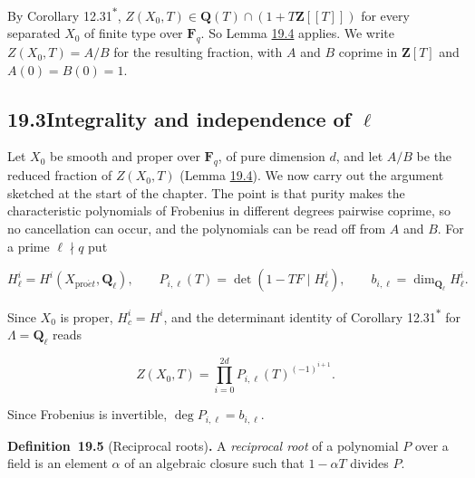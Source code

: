 \documentclass[11pt]{article}
\newenvironment{bpstatement}[2]{\par\addvspace{0.6\baselineskip}\noindent\textbf{#1}#2\textbf{.}\enspace\ignorespaces}
  {\par\addvspace{0.4\baselineskip}}
\newcommand{\bpout}[1]{#1\textsuperscript{\hyperlink{bp-outside}{\ensuremath{\ast}}}}
\begin{document}
\label{bp17}%
By Corollary \bpout{12.31}, \(Z(X_0,T)\in\mathbf Q(T)\cap(1+T\mathbf Z[[T]])\) for every separated \(X_0\) of finite type over \(\mathbf F_q\). So Lemma \hyperref[bp15]{19.4} applies. We write \(Z(X_0,T)=A/B\) for the resulting fraction, with \(A\) and \(B\) coprime in \(\mathbf Z[T]\) and \(A(0)=B(0)=1\).


\subsection*{\texorpdfstring{19.3\quad Integrality and independence of $\ell$}{19.3 Integrality and independence of ell}}
\label{bp18}%
\label{bp19}%
Let \(X_0\) be smooth and proper over \(\mathbf F_q\), of pure dimension \(d\), and let \(A/B\) be the reduced fraction of \(Z(X_0,T)\) (Lemma \hyperref[bp15]{19.4}). We now carry out the argument sketched at the start of the chapter. The point is that purity makes the characteristic polynomials of Frobenius in different degrees pairwise coprime, so no cancellation can occur, and the polynomials can be read off from \(A\) and \(B\). For a prime \(\ell\nmid q\) put

\[
H^i_\ell=H^i(X_{\mathrm{pro}\acute{e}t},\mathbf Q_\ell),\qquad
P_{i,\ell}(T)=\det(1-TF\mid H^i_\ell),\qquad
b_{i,\ell}=\dim_{\mathbf Q_\ell}H^i_\ell.
\]

Since \(X_0\) is proper, \(H^i_c=H^i\), and the determinant identity of Corollary \bpout{12.31} for \(\Lambda=\mathbf Q_\ell\) reads

\[
Z(X_0,T)=\prod_{i=0}^{2d}P_{i,\ell}(T)^{(-1)^{i+1}}.
\tag{19.1}
\]

Since Frobenius is invertible, \(\deg P_{i,\ell}=b_{i,\ell}\).

\label{bp20}%
\begin{bpstatement}{Definition~19.5}{ (Reciprocal roots)}
A \emph{reciprocal root} of a polynomial \(P\) over a field is an element \(\alpha\) of an algebraic closure such that \(1-\alpha T\) divides \(P\).
\end{bpstatement}
\end{document}
